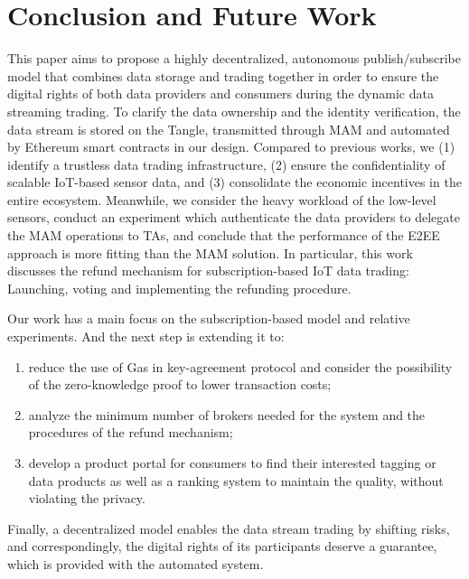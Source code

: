 \documentclass[conference]{IEEEtran}
\begin{document}
\section{Conclusion and Future Work}
\label{section:conclusion}
This paper aims to propose a highly decentralized, autonomous publish/subscribe model that combines data storage and trading together in order to ensure the digital rights of both data providers and consumers during the dynamic data streaming trading. To clarify the data ownership and the identity verification, the data stream is stored on the Tangle, transmitted through MAM and automated by Ethereum smart contracts in our design. Compared to previous works, we (1) identify a trustless data trading infrastructure, (2) ensure the confidentiality of scalable IoT-based sensor data, and (3) consolidate the economic incentives in the entire ecosystem. Meanwhile, we consider the heavy workload of the low-level sensors, conduct an experiment which authenticate the data providers to delegate the MAM operations to TAs, and conclude that the performance of the E2EE approach is more fitting than the MAM solution. In particular, this work discusses the refund mechanism for subscription-based IoT data trading: Launching, voting and implementing the refunding procedure.

Our work has a main focus on the subscription-based model and relative experiments. And the next step is extending it to:
\begin{enumerate}
	\item reduce the use of Gas in key-agreement protocol and consider the possibility of the zero-knowledge proof to lower transaction costs;
	\item analyze the minimum number of brokers needed for the system and the procedures of the refund mechanism;
	\item develop a product portal for consumers to find their interested tagging or data products as well as a ranking system to maintain the quality, without violating the privacy.
\end{enumerate}

Finally, a decentralized model enables the data stream trading by shifting risks, and correspondingly, the digital rights of its participants deserve a guarantee, which is provided with the automated system.



\end{document}
